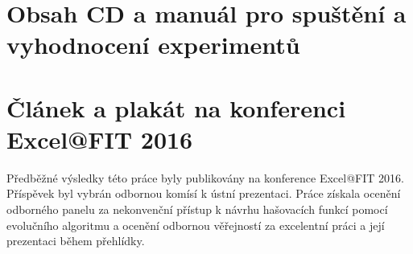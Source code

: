 \chapter{Obsah CD a manuál pro spuštění a vyhodnocení experimentů}

\chapter{Článek a plakát na konferenci Excel@FIT 2016}
Předběžné výsledky této práce byly publikovány na konference Excel@FIT 2016. Příspěvek byl vybrán
odbornou komísí k ústní prezentaci. Práce získala ocenění odborného panelu za nekonvenční přístup k návrhu hašovacích
funkcí pomocí evolučního algoritmu a ocenění odbornou věřejností za excelentní práci a její prezentaci během přehlídky.

\newpage
\begin{figure}[!ht]
	\centering 
	
\end{figure}
\newpage
\begin{figure}[!ht]
	\centering 
	
\end{figure}
\newpage
\begin{figure}[!ht]
	\centering 
	
\end{figure}
\newpage
\begin{figure}[!ht]
	\centering 
	
\end{figure}
\newpage
\begin{figure}[!ht]
	\centering 
	
\end{figure}
\newpage
\begin{figure}[!ht]
	\centering 
	
\end{figure}


